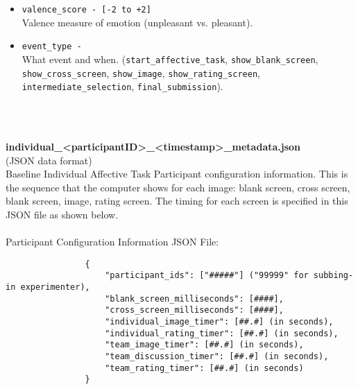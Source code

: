 \begin{description}
\begin{addmargin}[0em]{0em}
\begin{addmargin}[1em]{0em}
\begin{itemize}
                \item \verb|valence_score - [-2 to +2]|\\Valence measure of emotion (unpleasant vs. pleasant).
                \item \verb|event_type -|\\What event and when.
                    (\verb|start_affective_task|, \verb|show_blank_screen|,
                    \verb|show_cross_screen|, \verb|show_image|, \verb|show_rating_screen|,
                    \verb|intermediate_selection|, \verb|final_submission|).
            \end{itemize}
        \end{addmargin} %


        \textbf{\\\\}
        \begin{addmargin}[1em]{0em} %
            \textbf{individual\_<participantID>\_<timestamp>\_metadata.json}\\(JSON data format)\\
            Baseline Individual Affective Task Participant configuration information.
            This is the sequence that the computer shows for each image: blank screen, cross screen, blank screen, image, rating screen.
            The timing for each screen is specified in this JSON file as shown below.\\\\
            Participant Configuration Information JSON File:
            \begin{verbatim}
                {
                    "participant_ids": ["#####"] ("99999" for subbing-in experimenter),
                    "blank_screen_milliseconds": [####],
                    "cross_screen_milliseconds": [####],
                    "individual_image_timer": [##.#] (in seconds),
                    "individual_rating_timer": [##.#] (in seconds),
                    "team_image_timer": [##.#] (in seconds),
                    "team_discussion_timer": [##.#] (in seconds),
                    "team_rating_timer": [##.#] (in seconds)
                }
            \end{verbatim}
        \end{addmargin} %



\end{addmargin}
\end{description}
